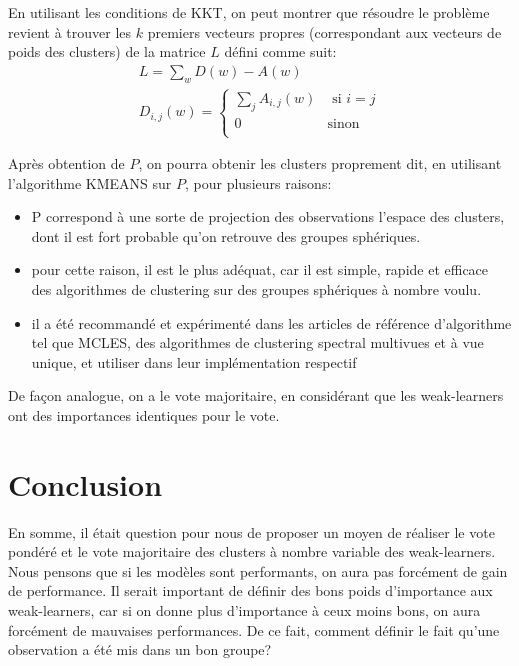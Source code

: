 \documentclass[12pt, french, latin.medieval, a4paper]{report}
\begin{document}
   	 En utilisant les conditions de KKT, on peut montrer que résoudre le problème revient à trouver les $k$ premiers vecteurs propres (correspondant aux vecteurs de poids des clusters) de la matrice $L$ défini comme suit:
     \begin{equation}
   		 \begin{aligned}
   			L = \sum_w D(w) - A(w)
            \\ D_{i,j}(w) = \begin{cases}
                    \sum_j A_{i,j}(w) & \text{ si $i = j$}  \\
                    0 & \text{sinon} \\
                \end{cases}
   		 \end{aligned}
   	 \end{equation}

   	 Après obtention de $P$, on pourra obtenir les clusters proprement dit, en utilisant l'algorithme KMEANS sur $P$, pour plusieurs  raisons:
   	 \begin{itemize}
   		 \item P correspond à une sorte de projection des observations l’espace des clusters, dont il est fort probable qu’on retrouve des groupes sphériques.
   		 \item pour cette raison, il est le plus adéquat, car il est simple, rapide et efficace des algorithmes de clustering sur des groupes sphériques à nombre voulu.
   		 \item il a été recommandé et expérimenté dans les articles de référence d'algorithme tel que MCLES, des algorithmes de clustering spectral multivues et à vue unique, et utiliser dans leur implémentation respectif
   	 \end{itemize}

   	 De façon analogue, on a le vote majoritaire, en considérant que les weak-learners ont des importances identiques pour le vote.

    \section{Conclusion}
    En somme, il était question pour nous de proposer un moyen de réaliser le vote pondéré et le vote majoritaire des clusters à nombre variable des weak-learners.
    Nous pensons que si les modèles sont performants, on aura pas forcément de gain de performance.
    Il serait important de définir des bons poids d'importance aux weak-learners, car si on donne plus d'importance à ceux moins bons, on aura forcément de mauvaises performances.
	De ce fait, comment définir le fait qu’une observation a été mis dans un bon groupe?
   

	
\end{document}
